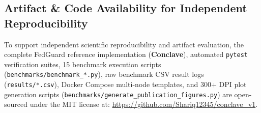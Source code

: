 \subsection{Artifact \& Code Availability for Independent Reproducibility}

To support independent scientific reproducibility and artifact evaluation, the complete FedGuard reference implementation (\textbf{Conclave}), automated \texttt{pytest} verification suites, 15 benchmark execution scripts (\texttt{benchmarks/benchmark\_*.py}), raw benchmark CSV result logs (\texttt{results/*.csv}), Docker Compose multi-node templates, and 300+ DPI plot generation scripts (\texttt{benchmarks/generate\_publication\_figures.py}) are open-sourced under the MIT license at: \url{https://github.com/Shariq12345/conclave_v1}.
